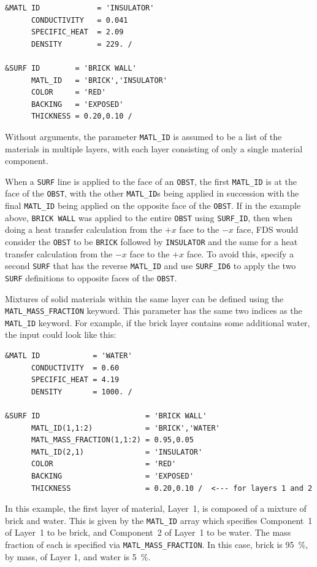\documentclass[11pt]{book}
\newcommand{\ct}{\tt\small}
\begin{document}
\footnotesize
\begin{verbatim}
&MATL ID             = 'INSULATOR'
      CONDUCTIVITY   = 0.041
      SPECIFIC_HEAT  = 2.09
      DENSITY        = 229. /

&SURF ID        = 'BRICK WALL'
      MATL_ID   = 'BRICK','INSULATOR'
      COLOR     = 'RED'
      BACKING   = 'EXPOSED'
      THICKNESS = 0.20,0.10 /
\end{verbatim}
\normalsize

\noindent
Without arguments, the parameter {\ct MATL\_ID} is assumed to be a list of the materials in multiple layers, with each layer consisting of only a single material component.

When a {\ct SURF} line is applied to the face of an {\ct OBST}, the first {\ct MATL\_ID} is at the face of the {\ct OBST}, with the
other {\ct MATL\_ID}s being applied in succession with the final {\ct MATL\_ID} being applied on the opposite face of the {\ct OBST}.
If in the example above, {\ct BRICK WALL} was applied to the entire {\ct OBST} using {\ct SURF\_ID}, then when doing a heat transfer calculation
from the $+x$ face to the $-x$ face, FDS would consider the {\ct OBST} to be {\ct BRICK} followed by {\ct INSULATOR} and the same for a heat transfer
calculation from the $-x$ face to the $+x$ face.  To avoid this, specify a second {\ct SURF} that has the reverse {\ct MATL\_ID}
and use {\ct SURF\_ID6} to apply the two {\ct SURF} definitions to opposite faces of the {\ct OBST}.

Mixtures of solid materials within the same layer can be defined using
the {\ct MATL\_MASS\_FRACTION} keyword. This parameter has the same
two indices as the {\ct MATL\_ID} keyword. For example, if the
brick layer contains some additional water, the input could look like this:

\footnotesize
\begin{verbatim}
&MATL ID            = 'WATER'
      CONDUCTIVITY  = 0.60
      SPECIFIC_HEAT = 4.19
      DENSITY       = 1000. /

&SURF ID                        = 'BRICK WALL'
      MATL_ID(1,1:2)            = 'BRICK','WATER'
      MATL_MASS_FRACTION(1,1:2) = 0.95,0.05
      MATL_ID(2,1)              = 'INSULATOR'
      COLOR                     = 'RED'
      BACKING                   = 'EXPOSED'
      THICKNESS                 = 0.20,0.10 /  <--- for layers 1 and 2
\end{verbatim}
\normalsize
\noindent
In this example, the first layer of material, Layer~1, is composed of a mixture of
brick and water. This is given by the {\ct MATL\_ID} array which specifies
Component~1 of Layer~1 to be brick, and Component~2 of
Layer~1 to be water. The mass fraction of each is specified via {\ct MATL\_MASS\_FRACTION}. In this
case, brick is 95~\%, by mass, of Layer 1, and water is 5~\%.
\end{document}
